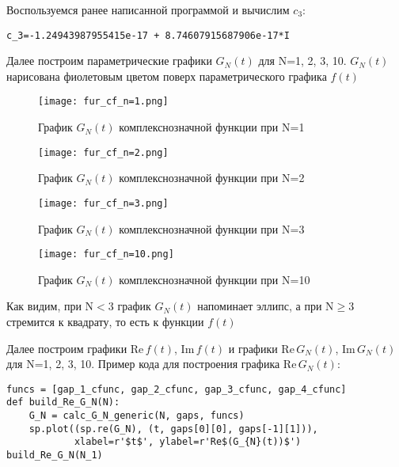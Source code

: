 \documentclass[a4paper, 16pt]{article}
\begin{document}
\noindent Воспользуемся ранее написанной программой и вычислим $c_3$:
\begin{lstlisting}
c_3=-1.24943987955415e-17 + 8.74607915687906e-17*I
\end{lstlisting}


\noindent Далее построим параметрические графики $G_N(t)$ для N=1, 2, 3, 10. $G_N(t)$
нарисована фиолетовым цветом поверх параметрического графика $f(t)$


\newpage
\vspace*{10mm}
\begin{figure}[!htb]
    \centering
    \texttt{[image: fur\_cf\_n=1.png]}
    \captionsetup{skip=0pt}
    \caption{График $G_N(t)$ комплекснозначной функции при N=1}
    \label{Рис:36}
\end{figure}
\begin{figure}[!htb]
    \centering
    \texttt{[image: fur\_cf\_n=2.png]}
    \captionsetup{skip=0pt}
    \caption{График $G_N(t)$ комплекснозначной функции при N=2}
    \label{Рис:37}
\end{figure}
\newpage
\begin{figure}[!htb]
    \centering
    \texttt{[image: fur\_cf\_n=3.png]}
    \captionsetup{skip=0pt}
    \caption{График $G_N(t)$ комплекснозначной функции при N=3}
    \label{Рис:38}
\end{figure}
\begin{figure}[!htb]
    \centering
    \texttt{[image: fur\_cf\_n=10.png]}
    \captionsetup{skip=0pt}
    \caption{График $G_N(t)$ комплекснозначной функции при N=10}
    \label{Рис:39}
\end{figure}


\noindent Как видим, при N$<$3 график $G_N(t)$ напоминает эллипс, а
при N$\geq3$ стремится к квадрату, то есть к функции $f(t)$


\noindent Далее построим графики Re$\,f(t)$, Im$\,f(t)$ и графики Re$\,G_N(t)$, Im$\,G_N(t)$ для N=1, 2, 3, 10.
Пример кода для построения графика Re$\,G_N(t)$:
\begin{lstlisting}
funcs = [gap_1_cfunc, gap_2_cfunc, gap_3_cfunc, gap_4_cfunc]
def build_Re_G_N(N):
    G_N = calc_G_N_generic(N, gaps, funcs)
    sp.plot((sp.re(G_N), (t, gaps[0][0], gaps[-1][1])),
            xlabel=r'$t$', ylabel=r'Re$(G_{N}(t))$')
build_Re_G_N(N_1)
\end{lstlisting}
\end{document}
